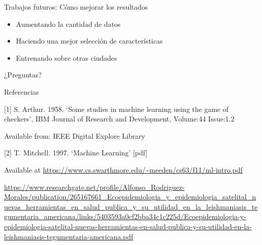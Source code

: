 \documentclass[10pt]{beamer}
\begin{document}
\begin{frame}{Trabajos futuros: Cómo mejorar los resultados}
    \begin{itemize}[<+->]
    \item Aumentando la cantidad de datos
    \item Haciendo una mejor selección de características
    \item Entrenando sobre otras ciudades
    \end{itemize}
\end{frame}

\begin{frame}[standout]
  ¿Preguntas?
\end{frame}

\appendix

\begin{frame}{Referencias}

[1] S. Arthur. 1958. ‘Some studies in machine learning using the game of
checkers', IBM Journal of Research and Development, Volume:44 Issue:1.2

Available from: IEEE Digital Explore Library

[2] T. Mitchell. 1997. ‘Machine Learning’ [pdf]

Available at \url{https://www.cs.swarthmore.edu/~meeden/cs63/f11/ml-intro.pdf}

  \url{https://www.researchgate.net/profile/Alfonso_Rodriguez-Morales/publication/265167661_Ecoepidemiologia_y_epidemiologia_satelital_nuevas_herramientas_en_salud_publica_y_su_utilidad_en_la_leishmaniasis_tegumentaria_americana/links/5403593a0cf2bba34c1c225d/Ecoepidemiologia-y-epidemiologia-satelital-nuevas-herramientas-en-salud-publica-y-su-utilidad-en-la-leishmaniasis-tegumentaria-americana.pdf}

\end{frame}
\end{document}
